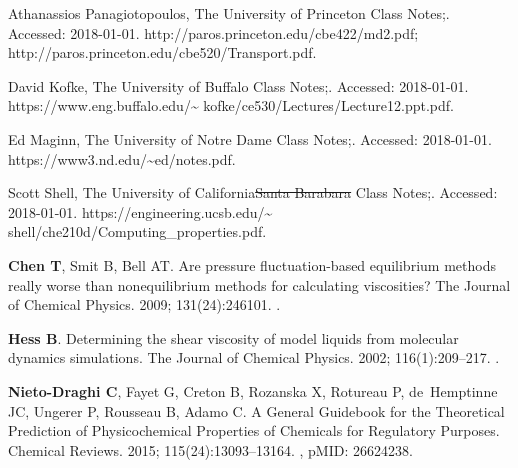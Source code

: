 \documentclass[9pt,bestpractices]{livecoms}
\providecommand{\DIFadd}[1]{{\protect\color{blue}\uwave{#1}}} %
\providecommand{\DIFdel}[1]{{\protect\color{red}\sout{#1}}}                      %
\providecommand{\DIFaddbegin}{} %
\providecommand{\DIFaddend}{} %
\providecommand{\DIFdelbegin}{} %
\providecommand{\DIFdelend}{} %
\begin{document}
\begin{thebibliography}{61}
	Athanassios Panagiotopoulos, The University of Princeton Class Notes;.
	\newblock Accessed: 2018-01-01.
	\newblock http://paros.princeton.edu/cbe422/md2.pdf;
	http://paros.princeton.edu/cbe520/Transport.pdf.
	
	David Kofke, The University of Buffalo Class Notes;.
	\newblock Accessed: 2018-01-01.
	\newblock https://www.eng.buffalo.edu/\textasciitilde
	kofke/ce530/Lectures/Lecture12.ppt.pdf.
	
	Ed Maginn, The University of Notre Dame Class Notes;.
	\newblock Accessed: 2018-01-01.
	\newblock https://www3.nd.edu/\textasciitilde ed/notes.pdf.
	
	Scott Shell, The University of California\DIFdelbegin \DIFdel{Santa Barabara }\DIFdelend \DIFaddbegin \DIFadd{, Santa Barbara }\DIFaddend Class Notes;.
	\newblock Accessed: 2018-01-01.
	\newblock https://engineering.ucsb.edu/\textasciitilde
	shell/che210d/Computing\_properties.pdf.
	
	\textbf{\color{LiveCoMSMediumGrey} Chen T}, Smit B, Bell AT.
	\newblock Are pressure fluctuation-based equilibrium methods really worse than
	nonequilibrium methods for calculating viscosities?
	\newblock The Journal of Chemical Physics.  2009; 131(24):246101.
	\newblock \href{https://dx.doi.org/10.1063/1.3274802}{\doiprefix
		}.
	
	\textbf{\color{LiveCoMSMediumGrey} Hess B}.
	\newblock Determining the shear viscosity of model liquids from molecular
	dynamics simulations.
	\newblock The Journal of Chemical Physics.  2002; 116(1):209--217.
	\newblock \href{https://dx.doi.org/10.1063/1.1421362}{\doiprefix
		}.
	
	\textbf{\color{LiveCoMSMediumGrey} Nieto-Draghi C}, Fayet G, Creton B, Rozanska
	X, Rotureau P, de~Hemptinne JC, Ungerer P, Rousseau B, Adamo C.
	\newblock A General Guidebook for the Theoretical Prediction of Physicochemical
	Properties of Chemicals for Regulatory Purposes.
	\newblock Chemical Reviews.  2015; 115(24):13093--13164.
	\newblock \href{https://dx.doi.org/10.1021/acs.chemrev.5b00215}{\doiprefix
		}, pMID: 26624238.
	

\end{thebibliography}
\end{document}
